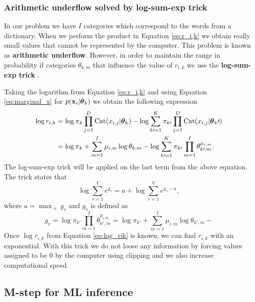 \documentclass[12pt]{article}
\begin{document}
\subsubsection{Arithmetic underflow solved by log-sum-exp trick}

In our problem we have $I$ categories which correspond to the words from a dictionary. When we perform the product in Equation \ref{eq:r_i,k} we obtain really small values that cannot be represented by the computer. This problem is known as \textbf{arithmetic underflow}. However, in order to maintain the range in probability if categories $\theta_{k,m}$ that influence the value of $r_{i,k}$ we use the \textbf{log-sum-exp trick} \cite{logsumexp}.

\noindent Taking the logarithm from Equation \ref{eq:r_i,k} and using Equation \ref{eq:marginal_x} for $p(\mathbf{x}_i|\boldsymbol\theta_k)$ we obtain the following expression
\begin{align}\label{eq:log_rik}
\log r_{i,k} & = \log \pi_k\prod_{j=1}^{D}\operatorname{\mathrm{Cat}}(x_{i,j}|\boldsymbol\theta_k) - \log \sum \limits_{k\prime=1}^{K} \pi_{k\prime} \prod \limits_{j=1}^{D}\operatorname{\mathrm{Cat}}(x_{i,j}|\boldsymbol\theta_k\prime)\\
& = \log \pi_k + \sum\limits_{m=1}^{I}\mu_{i,m}\log\theta_{k,m} - \log \sum \limits_{k\prime=1}^{K} \pi_{k\prime} \prod \limits_{m=1}^{I} \theta_{k\prime,m}^{\mu_{i,m}}.
\end{align}
The log-sum-exp trick will be applied on the last term from the above equation. The trick states that
\begin{equation}
\log \sum _ { v = 1 } ^ { V } e ^ { g _ { v } } = a + \log \sum _ { v = 1 } ^ { V } e ^ { g _ { v } - a },
\end{equation}
where $a = \max_{\substack{v}} g_v$ and $g_v$ is defined as 
\begin{equation}
g_v = \log \pi_{k\prime} \prod \limits_{m=1}^{I} \theta_{k\prime,m}^{\mu_{i,m}} = \log \pi_{k\prime} + \sum\limits_{m=1}^{I}\mu_{i,m} \log \theta_{k\prime,m}-
\end{equation}
Once $\log r_{i,k}$ from Equation \ref{eq:log_rik} is known, we can find $r_{i,k}$ with an exponential. With this trick we do not loose any information by forcing values assigned to be 0 by the computer using clipping and we also increase computational speed. 

\subsection{M-step for ML inference}
\end{document}
